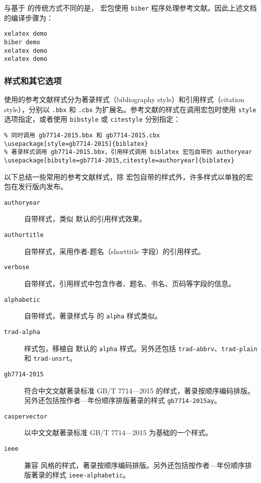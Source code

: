 与基于  的传统方式不同的是， 宏包使用 \texttt{biber} 程序处理参考文献。因此上述文档的编译步骤为：

\begin{verbatim}
xelatex demo
biber demo
xelatex demo
xelatex demo
\end{verbatim}

\subsubsection{ 样式和其它选项}

 使用的参考文献样式分为著录样式（bibliography style）和引用样式（citation style），分别以 \texttt{.bbx} 和 \texttt{.cbx} 为扩展名。参考文献的样式在调用宏包时使用 \texttt{style} 选项指定，或者使用 \texttt{bibstyle} 或 \texttt{citestyle} 分别指定：
\begin{verbatim}
% 同时调用 gb7714-2015.bbx 和 gb7714-2015.cbx
\usepackage[style=gb7714-2015]{biblatex}
% 著录样式调用 gb7714-2015.bbx，引用样式调用 biblatex 宏包自带的 authoryear
\usepackage[bibstyle=gb7714-2015,citestyle=authoryear]{biblatex}
\end{verbatim}

以下总结一些常用的参考文献样式，除  宏包自带的样式外，许多样式以单独的宏包在发行版内发布。

\begin{description}
  \item[\texttt{authoryear}]
   自带样式，类似  默认的引用样式效果。
  \item[\texttt{authortitle}]
   自带样式，采用作者-题名（shorttitle 字段）的引用样式。
  \item[\texttt{verbose}]
   自带样式，引用样式中包含作者、题名、书名、页码等字段的信息。
  \item[\texttt{alphabetic}]
   自带样式，著录样式与  的 \texttt{alpha} 样式类似。
  \item[\texttt{trad-alpha}]
   样式包，移植自  默认的 \texttt{alpha} 样式。另外还包括 \texttt{trad-abbrv}、\texttt{trad-plain} 和 \texttt{trad-unsrt}。
  \item[\texttt{gb7714-2015}]
  符合中文文献著录标准 GB/T 7714---2015 的样式，著录按顺序编码排版。另外还包括按作者—年份顺序排版著录的样式 \texttt{gb7714-2015ay}。
  \item[\texttt{caspervector}]
  以中文文献著录标准 GB/T 7714---2015 为基础的一个样式。
  \item[\texttt{ieee}]
  兼容  风格的样式，著录按顺序编码排版。另外还包括按作者—年份顺序排版著录的样式 \texttt{ieee-alphabetic}。
\end{description}

